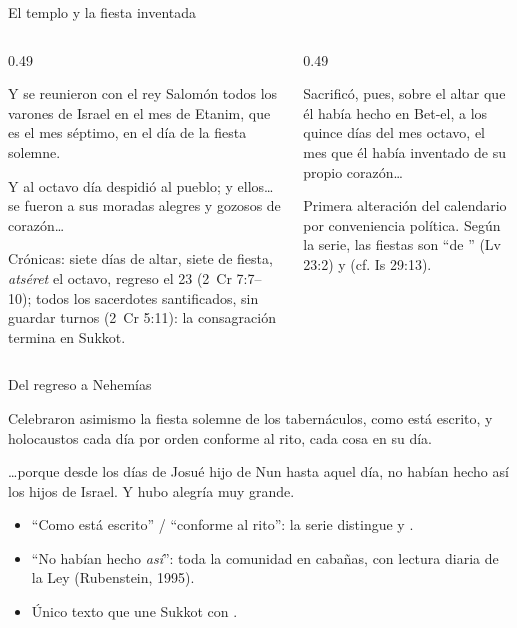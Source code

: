 \begin{frame}{El templo y la fiesta inventada}
\begin{columns}[t,onlytextwidth]
\begin{column}{0.49\textwidth}
\begin{cita}Y se reunieron con el rey Salomón todos los varones de Israel en el mes de Etanim, que es el mes séptimo, en el día de la fiesta solemne.\end{cita}
\begin{cita}Y al octavo día despidió al pueblo; y ellos\ldots{} se fueron a sus moradas alegres y gozosos de corazón\ldots{}\end{cita}
\scriptsize Crónicas: siete días de altar, siete de fiesta, \emph{atséret} el octavo, regreso el 23 (2~Cr 7:7--10); todos los sacerdotes santificados, sin guardar turnos (2~Cr 5:11): la consagración termina en Sukkot.
\end{column}
\begin{column}{0.49\textwidth}
\begin{cita}Sacrificó, pues, sobre el altar que él había hecho en Bet-el, a los quince días del mes octavo, el mes que él había inventado de su propio corazón\ldots{}\end{cita}
\scriptsize Primera alteración del calendario por conveniencia política. Según la serie, las fiestas son ``de \SENOR'' (Lv 23:2) y  (cf. Is 29:13).
\end{column}
\end{columns}
\end{frame}

\begin{frame}{Del regreso a Nehemías}
\begin{cita}Celebraron asimismo la fiesta solemne de los tabernáculos, como está escrito, y holocaustos cada día por orden conforme al rito, cada cosa en su día.\end{cita}
\begin{cita}\ldots{}porque desde los días de Josué hijo de Nun hasta aquel día, no habían hecho así los hijos de Israel. Y hubo alegría muy grande.\end{cita}
\small\begin{itemize}
\item ``Como está escrito'' / ``conforme al rito'': la serie distingue  y .
\item ``No habían hecho \emph{así}'': toda la comunidad en cabañas, con lectura diaria de la Ley (Rubenstein, 1995).
\item Único texto que une Sukkot con .
\end{itemize}
\end{frame}

